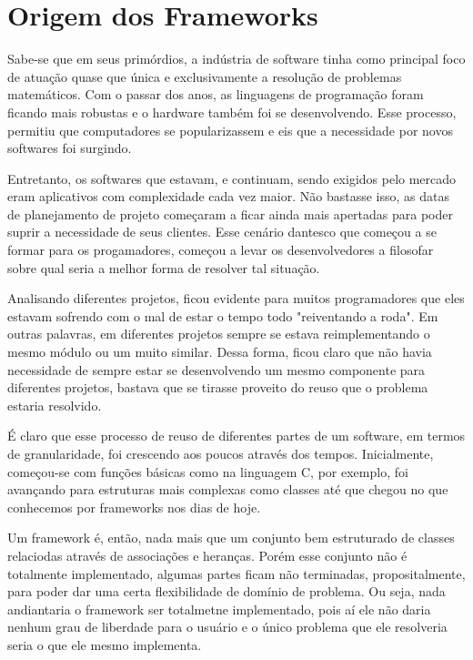 \documentclass[
    12pt,       %
    openright,      %
    twoside,      %
    a4paper,      %
    english,      %
    french,       %
    spanish,      %
    brazil,       %
    ]{abntex2}
\begin{document}
      \section{Origem dos Frameworks}
          Sabe-se que em seus primórdios, a indústria de software tinha como principal
          foco de atuação quase que única e exclusivamente a resolução de problemas
          matemáticos. Com o passar dos anos, as linguagens de programação
          foram ficando mais robustas e o hardware também foi se desenvolvendo. Esse
          processo, permitiu que computadores se popularizassem e eis que a necessidade
          por novos softwares foi surgindo.

          Entretanto, os softwares que estavam, e continuam, sendo exigidos pelo
          mercado eram aplicativos com complexidade cada vez maior. Não bastasse isso,
          as datas de planejamento de projeto começaram a ficar ainda mais apertadas
          para poder suprir a necessidade de seus clientes. Esse cenário dantesco
          que começou a se formar para os progamadores, começou a levar os desenvolvedores
          a filosofar sobre qual seria a melhor forma de resolver tal situação.

          Analisando diferentes projetos, ficou evidente para muitos programadores
          que eles estavam sofrendo com o mal de estar o tempo todo "reiventando
          a roda". Em outras palavras, em diferentes projetos sempre se estava
          reimplementando o mesmo módulo ou um muito similar. Dessa forma, ficou
          claro que não havia necessidade de sempre estar se desenvolvendo um mesmo
          componente para diferentes projetos, bastava que se tirasse proveito do reuso
          que o problema estaria resolvido.

          É claro que esse processo de reuso de diferentes partes de um software,
          em termos de granularidade, foi crescendo aos poucos através dos tempos.
          Inicialmente, começou-se com funções básicas como na linguagem C, por exemplo,
          foi avançando para estruturas mais complexas como classes até que chegou
          no que conhecemos por frameworks nos dias de hoje.

          Um framework é, então, nada mais que um conjunto bem estruturado de classes
          relaciodas através de associações e heranças. Porém esse conjunto não
          é totalmente implementado, algumas partes ficam não terminadas, propositalmente,
          para poder dar uma certa flexibilidade de domínio de problema. Ou seja, nada
          andiantaria o framework ser totalmetne implementado, pois
          aí ele não daria nenhum grau de liberdade para o usuário e o único problema
          que ele resolveria seria o que ele mesmo implementa.
\end{document}
